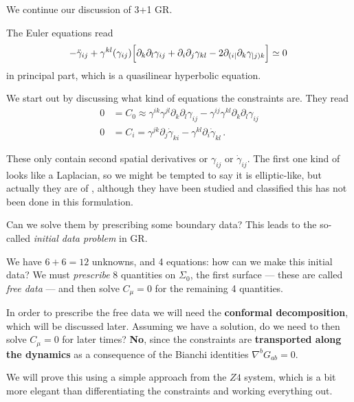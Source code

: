 \documentclass[main.tex]{subfiles}
\begin{document}

We continue our discussion of 3+1 GR. 

The Euler equations read 
%
\begin{align}
- \ddot{\gamma}_{ij} + \gamma^{kl} (\gamma_{ij}) \qty[
    \partial_{k} \partial_{l} \gamma_{ij}
    + \partial_{i} \partial_{j} \gamma_{kl}
    - 2 \partial_{(i|} \partial_{k} \gamma_{|j) k}
] \simeq 0
\,
\end{align}
%
in principal part, which is a quasilinear hyperbolic equation. 

We start out by discussing what kind of equations the constraints are. 
They read 
%
\begin{align}
0 &= C_0 \approx \gamma^{ik} \gamma^{jl} \partial_{k} \partial_{l} \gamma_{ij} - \gamma^{ij} \gamma^{kl} \partial_{k }\partial_{l} \gamma_{ij}  \\
0 &= C_i = \gamma^{jk} \partial_{j} \dot{\gamma}_{ki} - \gamma^{kl} \partial_{i} \dot{\gamma}_{kl}
\,.
\end{align}

These only contain second spatial derivatives or \(\gamma_{ij}\) or \(\dot{\gamma}_{ij}\). 
The first one kind of looks like a Laplacian, so we might be tempted to say it is elliptic-like, but actually they are of , although they have been studied and classified this has not been done in this formulation. 

Can we solve them by prescribing some boundary data? This leads to the so-called \emph{initial data problem} in GR. 

We have \(6+6=12\) unknowns, and 4 equations: how can we make this initial data? We must \emph{prescribe} 8 quantities on \(\Sigma_0\), the first surface --- these are called \emph{free data} --- and then solve \(C_\mu = 0\) for the remaining 4 quantities. 

In order to prescribe the free data we will need the \textbf{conformal decomposition}, which will be discussed later. 
Assuming we have a solution, do we need to then solve \(C_\mu = 0\) for later times? \textbf{No}, since the constraints are \textbf{transported along the dynamics} as a consequence of the Bianchi identities \(\nabla^{b} G_{ab}= 0\). 

We will prove this using a simple approach from the \(Z4\) system, which is a bit more elegant than differentiating the constraints and working everything out. 
\end{document}
